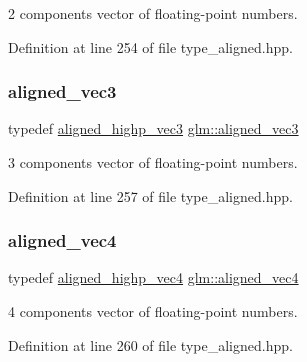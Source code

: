 2 components vector of floating-\/point numbers. 



Definition at line 254 of file type\+\_\+aligned.\+hpp.

\mbox{\label{group__gtc__type__aligned_ga9c54536a3becfd10a44f6b1b8c4aa3d3}} 
\subsubsection{\texorpdfstring{aligned\_vec3}{aligned\_vec3}}
{\footnotesize\ttfamily typedef \mbox{\hyperlink{group__gtc__type__aligned_ga69a63faccd6a139ff97748c81a603d50}{aligned\+\_\+highp\+\_\+vec3}} \mbox{\hyperlink{group__gtc__type__aligned_ga9c54536a3becfd10a44f6b1b8c4aa3d3}{glm\+::aligned\+\_\+vec3}}}



3 components vector of floating-\/point numbers. 



Definition at line 257 of file type\+\_\+aligned.\+hpp.

\mbox{\label{group__gtc__type__aligned_gad26d520694d7b865507819c2d9f2b196}} 
\subsubsection{\texorpdfstring{aligned\_vec4}{aligned\_vec4}}
{\footnotesize\ttfamily typedef \mbox{\hyperlink{group__gtc__type__aligned_ga4ec188da13bf0836f9a61b0b2b88425f}{aligned\+\_\+highp\+\_\+vec4}} \mbox{\hyperlink{group__gtc__type__aligned_gad26d520694d7b865507819c2d9f2b196}{glm\+::aligned\+\_\+vec4}}}



4 components vector of floating-\/point numbers. 



Definition at line 260 of file type\+\_\+aligned.\+hpp.

\mbox{\label{group__gtc__type__aligned_ga377e3268d132071ff041d9a1c960b2db}} 
